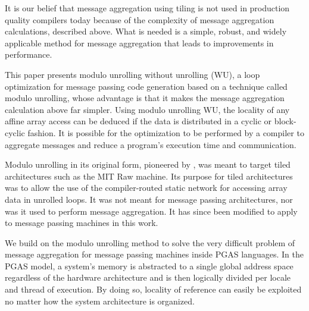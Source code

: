It is our belief that message aggregation using tiling is not used in production quality compilers today because of the complexity of message aggregation calculations, described above. What is needed is a simple, robust, and widely applicable method for message aggregation that leads to improvements in performance. 

This paper presents modulo unrolling without unrolling (WU), a loop optimization for message passing code generation based on a technique called modulo unrolling, whose advantage is that it makes the message aggregation calculation above far simpler. Using modulo unrolling WU, the locality of any affine array access can be deduced if the data is distributed in a cyclic or block-cyclic fashion. It is possible for the optimization to be performed by a compiler to aggregate messages and reduce a program's execution time and communication. 

Modulo unrolling in its original form, pioneered by \cite{barua1999maps}, was meant to target tiled architectures such as the MIT Raw machine. Its purpose for tiled architectures was to allow the use of the compiler-routed static network for accessing array data in unrolled loops. It was not meant for message passing architectures, nor was it used to perform message aggregation. It has since been modified to apply to message passing machines in this work. 

\begin{comment}

It its basic form, it unrolls each affine loop by a factor equal to the number of locales of the machine being utilized by the program. If the arrays used in the loop are distributed cyclically or block-cyclically, each array access is guaranteed to reside on a single locale across all iterations of the loop. Using this information, the compiler can then aggregate all remote array accesses that reside on a remote locale into a single message before the loop. If remote array elements are written to during the loop, a single message is required to store these elements back to each remote locale after the loop runs.
\end{comment} 

We build on the modulo unrolling method to solve the very difficult problem of message aggregation for message passing machines inside PGAS languages. In the PGAS model, a system's memory is abstracted to a single global address space regardless of the hardware architecture and is then logically divided per locale and thread of execution. By doing so, locality of reference can easily be exploited no matter how the system architecture is organized.


